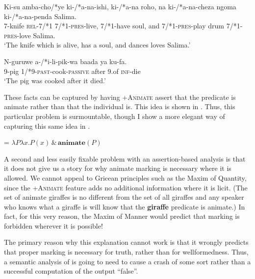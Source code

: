 \documentclass[output=paper
,newtxmath
,modfonts
,nonflat]{langsci/langscibook}
\begin{document}
\ea\label{ex:pesetsky:dancingkisu} \gll Ki-su amba-cho/*ye ki-/*a-na-ishi, ki-/*a-na roho, na ki-/*a-na-cheza ngoma ki-/*a-na-penda Salima. \\    \textsc{7}-knife \textsc{rel}-\textsc{7}/*\textsc{1} \textsc{7}/*\textsc{1}-\textsc{pres}-live, \textsc{7}/*\textsc{1}-have soul, and \textsc{7}/*\textsc{1}-\textsc{pres}-play drum \textsc{7}/*\textsc{1}-\textsc{pres}-love Salima. \\  \glt `The knife which is alive, has a soul, and dances loves Salima.' \\ \z
   
\ea\label{ex:pesetsky:pikwapigga} \gll N-guruwe a-/*i-li-pik-wa baada ya ku-fa. \\   \textsc{9}-pig \textsc{1}/*\textsc{9}-\textsc{past}-cook-\textsc{passive} after \textsc{9}.of \textsc{inf}-die \\ \glt `The pig was cooked after it died.'  \\ \z 

These facts can be captured by having +\textsc{Animate} assert that the predicate is animate rather than that the individual is.  This idea is shown in .  Thus, this particular problem is surmountable, though I show a more elegant way of capturing this same idea in . 

\ea\label{ex:pesetsky:assertanimatepredicates}  = $\lambda P \lambda x . P(x) \, \& \, \textbf{animate}(P) $ \\ \z

A second and less easily fixable problem with an assertion-based analysis is that it does not give us a story for why animate marking is necessary where it is allowed.  We cannot appeal to Gricean principles such as the Maxim of Quantity, since the +\textsc{Animate} feature adds no additional information where it is licit.  (The set of animate giraffes is no different from the set of all giraffes and any speaker who knows what a giraffe is will know that the \textbf{giraffe} predicate is animate.)  In fact, for this very reason, the Maxim of Manner would predict that  marking is forbidden wherever it is possible!

The primary reason why this explanation cannot work is that it wrongly predicts that proper  marking is necessary for truth, rather than for wellformedness. Thus, a semantic analysis of  is going to need to cause a crash of some sort rather than a successful computation of the output ``false''.
\end{document}
